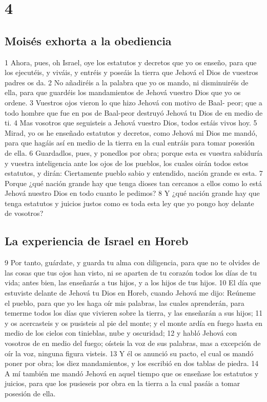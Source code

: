 \chapter{4}

\section{Moisés exhorta a la obediencia}

1 Ahora, pues, oh Israel, oye los estatutos y decretos que yo os enseño, para que los ejecutéis, y viváis, y entréis y poseáis la tierra que Jehová el Dios de vuestros padres os da.
2 No añadiréis a la palabra que yo os mando, ni disminuiréis de ella, para que guardéis los mandamientos de Jehová vuestro Dios que yo os ordene.
3 Vuestros ojos vieron lo que hizo Jehová con motivo de Baal- peor; que a todo hombre que fue en pos de Baal-peor destruyó Jehová tu Dios de en medio de ti.
4 Mas vosotros que seguisteis a Jehová vuestro Dios, todos estáis vivos hoy.
5 Mirad, yo os he enseñado estatutos y decretos, como Jehová mi Dios me mandó, para que hagáis así en medio de la tierra en la cual entráis para tomar posesión de ella.
6 Guardadlos, pues, y ponedlos por obra; porque esta es vuestra sabiduría y vuestra inteligencia ante los ojos de los pueblos, los cuales oirán todos estos estatutos, y dirán: Ciertamente pueblo sabio y entendido, nación grande es esta.
7 Porque ¿qué nación grande hay que tenga dioses tan cercanos a ellos como lo está Jehová nuestro Dios en todo cuanto le pedimos?
8 Y ¿qué nación grande hay que tenga estatutos y juicios justos como es toda esta ley que yo pongo hoy delante de vosotros?

\section{La experiencia de Israel en Horeb}

9 Por tanto, guárdate, y guarda tu alma con diligencia, para que no te olvides de las cosas que tus ojos han visto, ni se aparten de tu corazón todos los días de tu vida; antes bien, las enseñarás a tus hijos, y a los hijos de tus hijos.
10 El día que estuviste delante de Jehová tu Dios en Horeb, cuando Jehová me dijo: Reúneme el pueblo, para que yo les haga oír mis palabras, las cuales aprenderán, para temerme todos los días que vivieren sobre la tierra, y las enseñarán a sus hijos;
11 y os acercasteis y os pusisteis al pie del monte; y el monte ardía en fuego hasta en medio de los cielos con tinieblas, nube y oscuridad;
12 y habló Jehová con vosotros de en medio del fuego; oísteis la voz de sus palabras, mas a excepción de oír la voz, ninguna figura visteis.
13 Y él os anunció su pacto, el cual os mandó poner por obra; los diez mandamientos, y los escribió en dos tablas de piedra. 
14 A mí también me mandó Jehová en aquel tiempo que os enseñase los estatutos y juicios, para que los pusieseis por obra en la tierra a la cual pasáis a tomar posesión de ella.


